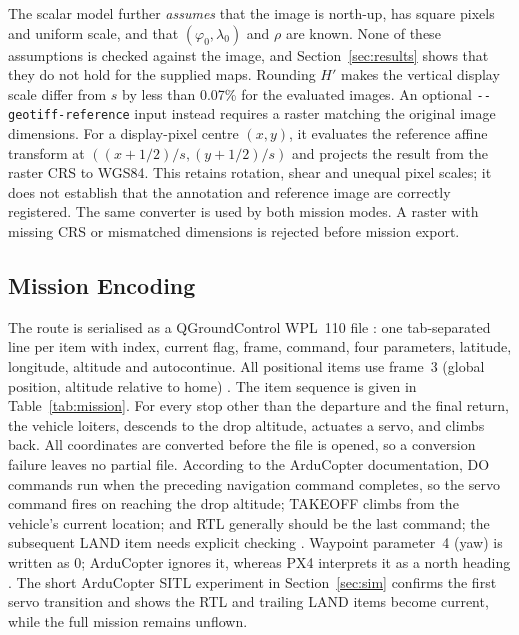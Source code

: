 The scalar model further \emph{assumes} that the image is north-up, has square pixels and uniform scale, and that $(\varphi_0,\lambda_0)$ and $\rho$ are known. None of these assumptions is checked against the image, and Section~\ref{sec:results} shows that they do not hold for the supplied maps. Rounding $H'$ makes the vertical display scale differ from $s$ by less than 0.07\% for the evaluated images. An optional \texttt{-{}-geotiff-reference} input instead requires a raster matching the original image dimensions. For a display-pixel centre $(x,y)$, it evaluates the reference affine transform at $((x+1/2)/s,(y+1/2)/s)$ and projects the result from the raster CRS to WGS84. This retains rotation, shear and unequal pixel scales; it does not establish that the annotation and reference image are correctly registered. The same converter is used by both mission modes. A raster with missing CRS or mismatched dimensions is rejected before mission export.

\subsection{Mission Encoding}
The route is serialised as a QGroundControl WPL~110 file \cite{mavlink_fileformat}: one tab-separated line per item with index, current flag, frame, command, four parameters, latitude, longitude, altitude and autocontinue. All positional items use frame~3 (global position, altitude relative to home) \cite{mavlink_common}. The item sequence is given in Table~\ref{tab:mission}. For every stop other than the departure and the final return, the vehicle loiters, descends to the drop altitude, actuates a servo, and climbs back. All coordinates are converted before the file is opened, so a conversion failure leaves no partial file. According to the ArduCopter documentation, DO commands run when the preceding navigation command completes, so the servo command fires on reaching the drop altitude; TAKEOFF climbs from the vehicle's current location; and RTL generally should be the last command; the subsequent LAND item needs explicit checking \cite{ardupilot_missioncmds}. Waypoint parameter~4 (yaw) is written as 0; ArduCopter ignores it, whereas PX4 interprets it as a north heading \cite{px4_missions}. The short ArduCopter SITL experiment in Section~\ref{sec:sim} confirms the first servo transition and shows the RTL and trailing LAND items become current, while the full mission remains unflown.

